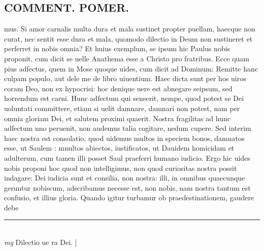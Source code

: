 \documentclass{article}
\begin{document}
\begin{pages}
\section*{COMMENT. POMER.  }\pstart mus. Si amor carnalis multa dura et mala sustinet propter puellam, haecque non curat, nec sentit esse dura et mala, quomodo dilectio in Deum non sustineret et perferret in nobis omnia? Et huius exemplum, se ipsum hic Paulus nobis proponit, cum dicit se uelle Anathema esse a Christo pro fratribus. Ecce quam pius adfectus, quem in Mose quoque uides, cum dicit ad Dominum: Remitte hanc culpam populo, aut dele me de libro uiuentium. Haec dicta sunt per hos uiros coram Deo, non ex hypocrisi: hoc denique uere est abnegare seipsum, sed horrendum est carni. Hunc adfectum qui senserit, nempe, quod potest se Dei uoluntati committere, etiam si uelit damnare, damnari non potest, nam per omnia gloriam Dei, et salutem proximi quaerit. Nostra fragilitas ad hunc adfectum nno peruenit, non audemus talia cogitare, nedum cupere. Sed interim haec nostra est consolatio, quod uidemus multos in speciem bonos, damnatos esse, ut Saulem : mnultos abiectos, iustificatos, ut Dauidem homicidam et adulterum, cum tamen illi posset Saul praeferri humano iudicio. Ergo hic uides nobis proponi hoc quod non intelligimus, non quod curiositas nostra possit indagare: Dei iudicia sunt et consilia, non nostra: illi, in omnibus quaecunque geruntur nobiscum, adscribamus necesse est, non nobis, nam nostra tantum est confusio, et illius gloria. Quando igitur turbamur ob praedestinationem, gaudere debe  \pend
\vspace{0.5cm}\noindent
\vspace{0.2cm}\rule{1cm}{0.2pt}\\ 
\hspace{0.2cm}\textit{mg}
\footnotesize Dilectio ue ra Dei. 
\normalsize| 

\end{pages}
\end{document}
